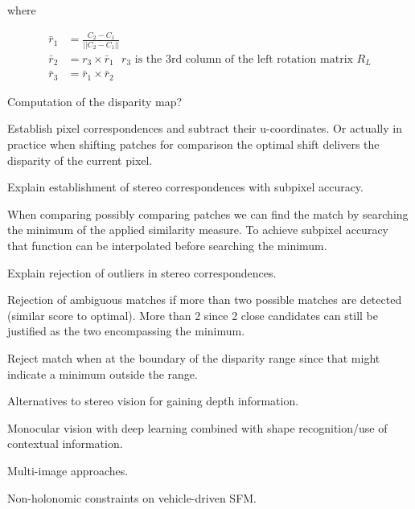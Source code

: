 \documentclass[10pt,a4paper]{scrartcl}
\begin{document}
\begin{multicols*}{2}
\begin{QandA}
\begin{enumerate}

where 

\begin{align*}
\bar{r}_1&=\frac{C_2-C_1}{||C_2-C_1||}\\
\bar{r}_2&=r_3\times\bar{r}_1\text{ $r_3$ is the 3rd column of the left rotation matrix $R_L$}\\
\bar{r}_3&=\bar{r}_1\times\bar{r}_2
\end{align*}
\end{enumerate}
\end{QandA}

\begin{QandA}
{Computation of the disparity map?}
\item Establish pixel correspondences and subtract their u-coordinates. Or actually in practice when shifting patches for comparison the optimal shift delivers the disparity of the current pixel.
\end{QandA}

\begin{QandA}
{Explain establishment of stereo correspondences with subpixel accuracy.}
\item When comparing possibly comparing patches we can find the match by searching the minimum of the applied similarity measure. To achieve subpixel accuracy that function can be interpolated before searching the minimum.
\end{QandA}

\begin{QandA}
{Explain rejection of outliers in stereo correspondences.}
\item Rejection of ambiguous matches if more than two possible matches are detected (similar score to optimal). More than 2 since 2 close candidates can still be justified as the two encompassing the minimum.
\item Reject match when at the boundary of the disparity range since that might indicate a minimum outside the range.
\end{QandA}

\begin{QandA}
{Alternatives to stereo vision for gaining depth information.}
\item Monocular vision with deep learning combined with shape recognition/use of contextual information.
\item Multi-image approaches.
\item Non-holonomic constraints on vehicle-driven SFM. 
\end{QandA}


\end{multicols*}
\end{document}
